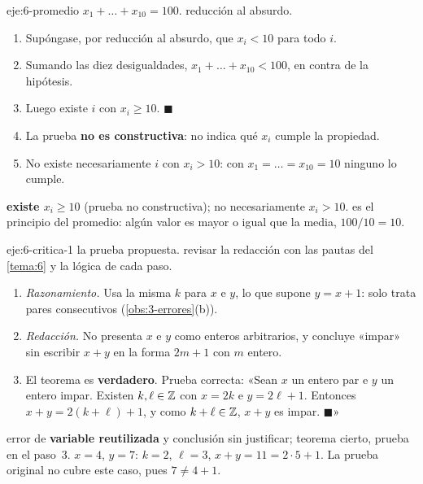 \begin{solucion}{eje:6-promedio}
\datos $x_1+\dots+x_{10}=100$.
\planteamiento reducción al absurdo.
\pasos
\begin{enumerate}[label=\arabic*.]
  \item Supóngase, por reducción al absurdo, que $x_i<10$ para todo $i$.
  \item Sumando las diez desigualdades, $x_1+\dots+x_{10}<100$, en contra de la hipótesis.
  \item Luego existe $i$ con $x_i\ge 10$. $\blacksquare$
  \item La prueba \textbf{no es constructiva}: no indica qué $x_i$ cumple la propiedad.
  \item No existe necesariamente $i$ con $x_i>10$: con $x_1=\dots=x_{10}=10$ ninguno lo cumple.
\end{enumerate}
\resultado \textbf{existe $x_i\ge 10$} (prueba no constructiva); no necesariamente $x_i>10$.
\comprobacion es el principio del promedio: algún valor es mayor o igual que la media, $100/10=10$.
\end{solucion}

\begin{solucion}{eje:6-critica-1}
\datos la prueba propuesta.
\planteamiento revisar la redacción con las pautas del \cref{tema:6} y la lógica de cada paso.
\pasos
\begin{enumerate}[label=\arabic*.]
  \item \emph{Razonamiento.} Usa la misma $k$ para $x$ e $y$, lo que supone $y=x+1$: solo trata pares consecutivos (\cref{obs:3-errores}(b)).
  \item \emph{Redacción.} No presenta $x$ e $y$ como enteros arbitrarios, y concluye «impar» sin escribir $x+y$ en la forma $2m+1$ con $m$ entero.
  \item El teorema es \textbf{verdadero}. Prueba correcta: «Sean $x$ un entero par e $y$ un entero impar. Existen $k,\ell\in\mathbb{Z}$ con $x=2k$ e $y=2\ell+1$. Entonces $x+y=2(k+\ell)+1$, y como $k+\ell\in\mathbb{Z}$, $x+y$ es impar. $\blacksquare$»
\end{enumerate}
\resultado error de \textbf{variable reutilizada} y conclusión sin justificar; teorema cierto, prueba en el paso~3.
\comprobacion $x=4$, $y=7$: $k=2$, $\ell=3$, $x+y=11=2\cdot 5+1$. La prueba original no cubre este caso, pues $7\neq 4+1$.
\end{solucion}

